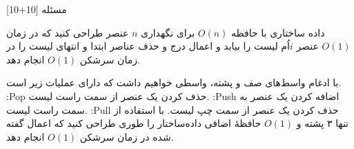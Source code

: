 
‌مسئله [10+10]

داده ساختاری با حافظه $O(n)$ برای نگهداری $n$ عنصر طراحی کنید که در زمان $O(1)$ عنصر $i$اُم لیست را بیابد و اعمال درج و حذف عناصر ابتدا و انتهای لیست را در زمان سرشکن $O(1)$ انجام دهد.


با ادغام واسط‌های صف و پشته، واسطی خواهیم داشت که دارای عملیات زیر است.
:Pop حذف کردن یک عنصر از سمت راست لیست. 
:Push اضافه کردن یک عنصر به سمت راست لیست.
:Pull حذف کردن یک عنصر از سمت چپ لیست.
با استفاده از تنها ۳ پشته و $O(1)$ حافظۀ اضافی داده‌ساختار را طوری طراحی کنید که اعمال گفته شده در زمان سرشکن $O(1)$ انجام دهد.













